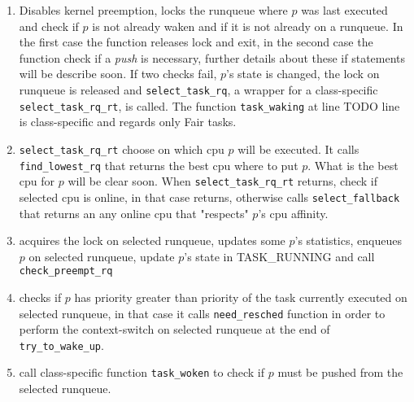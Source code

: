 \begin{enumerate}
\item Disables kernel preemption, locks the runqueue where $p$ was last executed and check 
if $p$ is not already waken and if it is not already on a runqueue. In the first case the 
function releases lock and exit, in the second case the function check if a
\textit{push} is necessary, further details about these if statements will be
describe soon. If two checks fail, $p$'s state is changed, the lock on runqueue
is released and \texttt{select\_task\_rq}, a wrapper for a class-specific 
\texttt{select\_task\_rq\_rt}, is called. The function \texttt{task\_waking}
at line TODO line is class-specific and regards only Fair tasks.

\lstset{basicstyle=\footnotesize, language=c, captionpos=b, frame=single,label=lis:steps}


\item \texttt{select\_task\_rq\_rt} choose on which cpu $p$ will be executed. It
calls \texttt{find\_lowest\_rq} that returns the best cpu where to put $p$. What
is the best cpu for $p$ will be clear soon. When \texttt{select\_task\_rq\_rt} 
returns, check if selected cpu is online, in that case returns, otherwise calls
\texttt{select\_fallback} that returns an any online cpu that "respects" $p$'s 
cpu affinity.

\lstset{basicstyle=\footnotesize, language=c, captionpos=b, frame=single,label=lis:steps}


\item acquires the lock on selected runqueue, updates some $p$'s statistics, enqueues 
$p$ on selected runqueue, update $p$'s state in TASK\_RUNNING and call
\texttt{check\_preempt\_rq}

\lstset{basicstyle=\footnotesize, language=c, captionpos=b, frame=single,label=lis:steps}


\item checks if $p$ has priority greater than priority of the task currently
executed on selected runqueue, in that case it calls \texttt{need\_resched}
function in order to perform the context-switch on selected runqueue at the
end of \texttt{try\_to\_wake\_up}.

\lstset{basicstyle=\footnotesize, language=c, captionpos=b, frame=single,label=lis:steps}


\item call class-specific function \texttt{task_woken} to check if $p$ must be
pushed from the selected runqueue.

\lstset{basicstyle=\footnotesize, language=c, captionpos=b, frame=single,label=lis:steps}


\end{enumerate}

